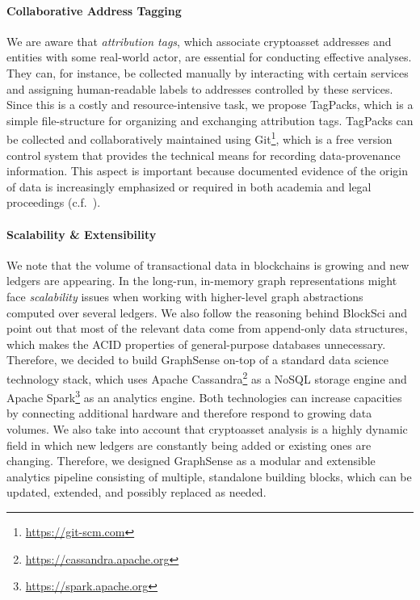 \paragraph{Collaborative Address Tagging} We are aware that \emph{attribution tags}, which associate cryptoasset addresses and entities with some real-world actor, are essential for conducting effective analyses. They can, for instance, be collected manually by interacting with certain services and assigning human-readable labels to addresses controlled by these services. Since this is a costly and resource-intensive task, we propose TagPacks, which is a simple file-structure for organizing and exchanging attribution tags. TagPacks can be collected and collaboratively maintained using Git\footnote{\url{https://git-scm.com}}, which is a free version control system that provides the technical means for recording data-provenance information. This aspect is important because documented evidence of the origin of data is increasingly emphasized or required in both academia and legal proceedings (c.f.~\cite{Froewis:2020a}).

\paragraph{Scalability \& Extensibility} We note that the volume of transactional data in blockchains is growing and new ledgers are appearing. In the long-run, in-memory graph representations might face \emph{scalability} issues when working with higher-level graph abstractions computed over several ledgers. We also follow the reasoning behind BlockSci and point out that most of the relevant data come from append-only data structures, which makes the ACID properties of general-purpose databases unnecessary. Therefore, we decided to build GraphSense on-top of a standard data science technology stack, which uses Apache Cassandra\footnote{\url{https://cassandra.apache.org}} as a NoSQL storage engine and Apache Spark\footnote{\url{https://spark.apache.org}} as an analytics engine. Both technologies can increase capacities by connecting additional hardware and therefore respond to growing data volumes. We also take into account that cryptoasset analysis is a highly dynamic field in which new ledgers are constantly being added or existing ones are changing. Therefore, we designed GraphSense as a modular and extensible analytics pipeline consisting of multiple, standalone building blocks, which can be updated, extended, and possibly replaced as needed.

